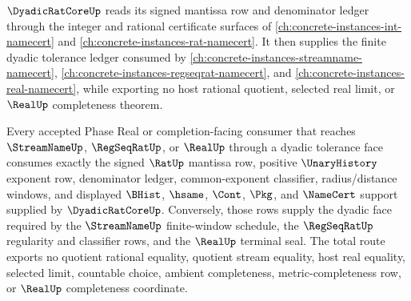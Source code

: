 $\DyadicRatCoreUp$ reads its signed mantissa row and denominator ledger through the integer and rational certificate surfaces of \autoref{ch:concrete-instances-int-namecert} and \autoref{ch:concrete-instances-rat-namecert}. It then supplies the finite dyadic tolerance ledger consumed by \autoref{ch:concrete-instances-streamname-namecert}, \autoref{ch:concrete-instances-regseqrat-namecert}, and \autoref{ch:concrete-instances-real-namecert}, while exporting no host rational quotient, selected real limit, or $\RealUp$ completeness theorem.

\begin{theorem}
\label{thm:dyadicratcore-l10-sibling-dependency-totality}
Every accepted Phase Real or completion-facing consumer that reaches
$\StreamNameUp$, $\RegSeqRatUp$, or $\RealUp$ through a dyadic tolerance face
consumes exactly the signed $\RatUp$ mantissa row, positive $\UnaryHistory$
exponent row, denominator ledger, common-exponent classifier,
radius/distance windows, and displayed $\BHist$, $\hsame$, $\Cont$, $\Pkg$,
and $\NameCert$ support supplied by $\DyadicRatCoreUp$. Conversely, those
rows supply the dyadic face required by the $\StreamNameUp$ finite-window
schedule, the $\RegSeqRatUp$ regularity and classifier rows, and the
$\RealUp$ terminal seal. The total route exports no quotient rational
equality, quotient stream equality, host real equality, selected limit,
countable choice, ambient completeness, metric-completeness row, or
$\RealUp$ completeness coordinate.
\end{theorem}
